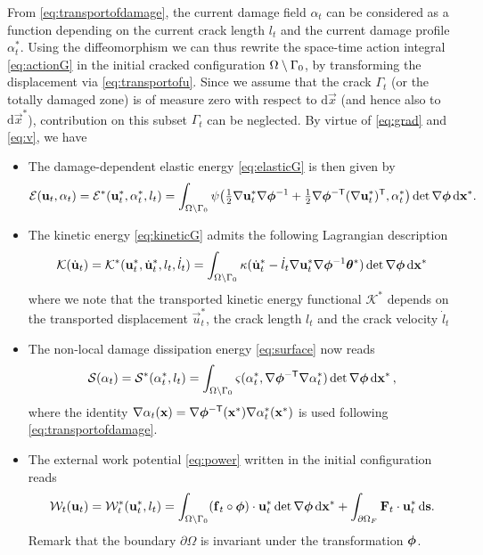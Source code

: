 From \eqref{eq:transportofdamage}, the current damage field $\alpha_t$ can be considered as a function depending on the current crack length $l_t$ and the current damage profile $\alpha_t^*$. Using the diffeomorphism we can thus rewrite the space-time action integral \eqref{eq:actionG} in the initial cracked configuration ${\Omega\setminus\Gamma_0}$, by transforming the displacement via \eqref{eq:transportofu}. Since we assume that the crack $\Gamma_t$ (or the totally damaged zone) is of measure zero with respect to $\mathrm{d}\vec{x}$ (and hence also to $\mathrm{d}\vec{x}^*$), contribution on this subset $\Gamma_t$ can be neglected. By virtue of \eqref{eq:grad} and \eqref{eq:v}, we have
\begin{itemize}
\item The damage-dependent elastic energy \eqref{eq:elasticG} is then given by
\begin{equation} \label{eq:elasticGi}
\mathcal{E}(\vec{u}_t,\alpha_t)=\mathcal{E}^*(\vec{u}_t^*,\alpha_t^*,l_t)=\int_\domaini\psi\bigl({\textstyle\frac{1}{2}}\nabla\vec{u}_t^*\nabla\philt^{-1}+{\textstyle\frac{1}{2}}\nabla\philt^{-\mathsf{T}}(\nabla\vec{u}_t^*)^\mT,\alpha_t^*\bigr)\det\nabla\philt\dxx.
\end{equation}

\item The kinetic energy \eqref{eq:kineticG} admits the following Lagrangian description
\begin{equation} \label{eq:kinetici}
\mathcal{K}(\dot{\vec{u}}_t)=\mathcal{K}^*(\vec{u}_t^*,\dot{\vec{u}}_t^*,l_t,\dot{l}_t)=\int_\domaini\kappa(\dot{\vec{u}}_t^*-\dot{l}_t\nabla\vec{u}_t^*\nabla\philt^{-1}\vtheta^*)\det\nabla\philt\dxx
\end{equation}
where we note that the transported kinetic energy functional $\mathcal{K}^*$ depends on the transported displacement $\vec{u}_t^*$, the crack length $l_t$ and the crack velocity $\dot{l}_t$

\item The non-local damage dissipation energy \eqref{eq:surface} now reads
\begin{equation} \label{eq:surfacei}
\mathcal{S}(\alpha_t)=\mathcal{S}^*(\alpha_t^*,l_t)=\int_\domaini\varsigma(\alpha_t^*,\nabla\philt^{-\mT}\nabla\alpha_t^*)\det\nabla\philt\dxx\,,
\end{equation}
where the identity $\nabla\alpha_t(\vec{x})=\nabla\philt^{-\mT}(\vec{x}^*)\nabla\alpha_t^*(\vec{x}^*)$ is used following \eqref{eq:transportofdamage}.

\item The external work potential \eqref{eq:power} written in the initial configuration reads
\begin{equation} \label{eq:externalworki}
\mathcal{W}_t(\vec{u}_t)=\mathcal{W}^*_t(\vec{u}_t^*,l_t)=\int_\domaini (\vec{f}_t\circ\philt)\cdot\vec{u}_t^*\det\nabla\philt\dxx+\int_{\partial\Omega_F} \vec{F}_t\cdot\vec{u}_t^*\D{\vec{s}}.
\end{equation}
Remark that the boundary $\partial\Omega$ is invariant under the transformation $\philt$.


\end{itemize}
